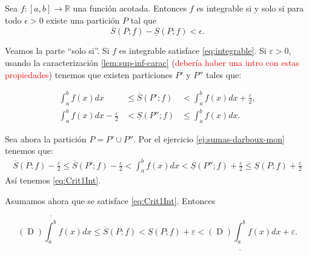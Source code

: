  
\begin{teorema}{}  Sea $f:[a,b]\to\mathbb{R}$ una función acotada. Entonces  $f$ es integrable si y solo si para todo $\epsilon>0$ existe una partición $P$ tal que 
\begin{equation}\label{eq:Crit1Int}
 \overline{S}(P;f)-\underline{S}(P;f)<\epsilon.
\end{equation}
 
\end{teorema}

\begin{demo} Veamos la parte ``solo si''. Si $f$ es integrable satisface \eqref{eq:integrable}. Si $\varepsilon>0$, usando la caracterización \eqref{lem:sup-inf-carac} (\textcolor{red}{debería haber una intro con estas propiedades}) tenemos que existen particiones $P'$ y $P''$ tales que:


\begin{eqnarray*}
 \int_a^bf(x)dx&\leq \overline{S}(P';f)&<\int_a^bf(x)dx+\frac{\varepsilon}{2},\\
 \int_a^bf(x)dx-\frac{\varepsilon}{2}&<\underline{S}(P'';f)&\leq\int_a^bf(x)dx.
\end{eqnarray*}

Sea ahora la partición $P=P'\cup P''$. Por el ejercicio \eqref{ej:sumas-darboux-mon} tenemos que:
\begin{multline*}
 \overline{S}(P;f)-\frac{\varepsilon}{2}\leq \overline{S}(P';f)-\frac{\varepsilon}{2}<\int_a^bf(x)dx<\underline{S}(P'';f)+\frac{\varepsilon}{2}
 \leq \underline{S}(P;f)+\frac{\varepsilon}{2}
\end{multline*}
Así tenemos \eqref{eq:Crit1Int}. 

Asumamos ahora que se satisface \eqref{eq:Crit1Int}. Entonces 

 \[
   (\mathop{D})\overline{\int_a^b}f(x)dx\leq \overline{S}(P;f)<
   \underline{S}(P;f)+\varepsilon<(\mathop{D})\underline{\int_a^b}f(x)dx +\varepsilon.
 \]
\end{demo}


